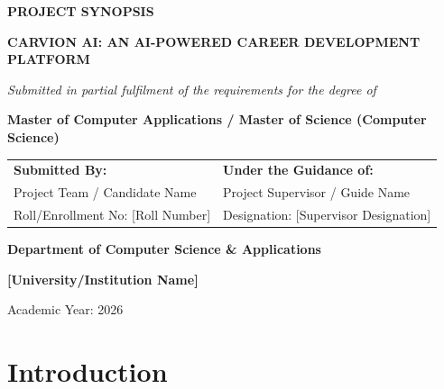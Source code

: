 \documentclass[12pt,a4paper]{article}
\begin{document}
\begin{titlepage}
\centering
\vspace*{1.5cm}

{\Large\textbf{PROJECT SYNOPSIS} \par}
\vspace{1cm}

{\Large \textbf{CARVION AI: AN AI-POWERED CAREER DEVELOPMENT PLATFORM} \par}
\vspace{2.5cm}

{\large\textit{Submitted in partial fulfilment of the requirements for the degree of} \par}
\vspace{0.2cm}
{\large\textbf{Master of Computer Applications / Master of Science (Computer Science)} \par}

\vfill

\begin{table}[h]
\centering
\begin{tabular}{ll}
\textbf{Submitted By:} & \textbf{Under the Guidance of:} \\
Project Team / Candidate Name & Project Supervisor / Guide Name \\
Roll/Enrollment No: [Roll Number] & Designation: [Supervisor Designation] \\
\end{tabular}
\end{table}

\vfill
\vspace{1cm}



\vspace{1cm}
{\large \textbf{Department of Computer Science \& Applications} \par}
{\large \textbf{[University/Institution Name]} \par}
{\large Academic Year: 2026 \par}

\end{titlepage}

\clearpage
{}

\section{Introduction}
\end{document}
